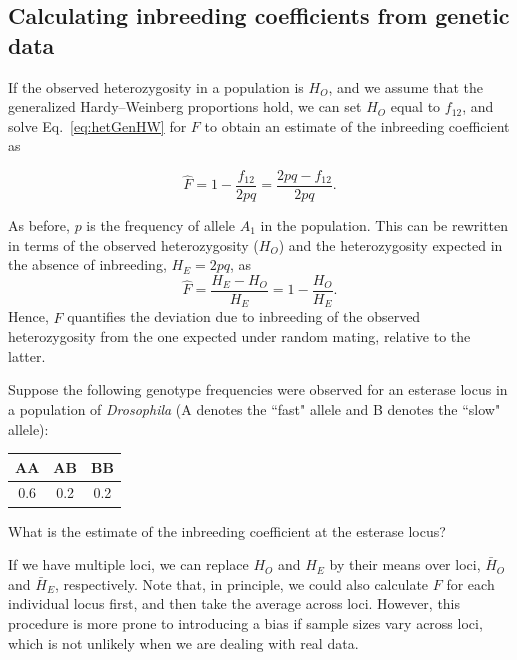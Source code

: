 {{\subsection{Calculating inbreeding coefficients from genetic data}


If the observed heterozygosity in a population is $H_O$, and we assume that the
generalized Hardy--Weinberg proportions hold, we can set $H_O$ equal to
$f_{12}$, and solve Eq.\ \eqref{eq:hetGenHW} for $F$ to obtain an estimate of
the inbreeding coefficient as

\begin{equation}
\hat{F} = 1-\frac{f_{12}}{2pq} = \frac{2pq - f_{12}}{2pq}.
\label{eqn:Fhat}
\end{equation}

As before, $p$ is the frequency of allele $A_{1}$ in the population. This can
be rewritten in terms of the observed heterozygosity ($H_O$) and the
heterozygosity expected in the absence of inbreeding, $H_E=2pq$, as
\begin{equation}
\hat{F} = \frac{H_E-H_O}{H_E} = 1 - \frac{H_O}{H_E}.
\label{eqn:FhatHO}
\end{equation}
Hence, $\hat{F}$ quantifies the deviation due to inbreeding of the observed heterozygosity from the one expected under random mating, relative to the latter.

\begin{question}
  Suppose the following genotype frequencies were observed for an esterase locus in a population of \textit{Drosophila} (A denotes the ``fast" allele and B denotes the ``slow" allele):
\begin{center}
\begin{tabular}{ccc}
\hline
AA &	AB &	BB\\
\hline
0.6 &	0.2 &	0.2\\
\end{tabular}
\end{center}
What is the estimate of the inbreeding coefficient at the esterase locus?
\end{question}

If we have multiple loci, we can replace $H_O$ and $H_E$ by their means
over loci, $\bar{H}_O$ and $\bar{H}_E$, respectively. Note that, in principle, we could also calculate $F$ for each individual locus first, and then take the average across loci. However, this procedure is more prone to introducing a bias if sample sizes vary across loci, which is not unlikely when we are dealing with real data.


}}
